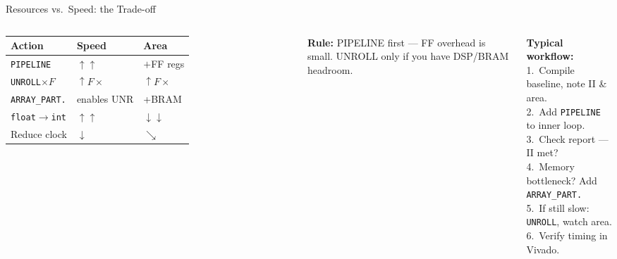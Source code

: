 \documentclass[aspectratio=169,12pt]{beamer}
\begin{document}
\begin{frame}{Resources vs.\ Speed: the Trade-off}
\vspace{0.1cm}
\begin{columns}[T,totalwidth=\textwidth]


  \begin{tabular}{p{2.6cm}p{1.2cm}p{1.6cm}}
    \hline
    \rowcolor{Navy!10}\textbf{Action} & \textbf{Speed} & \textbf{Area}\\
    \hline
    \texttt{PIPELINE}      & $\uparrow\uparrow$ & $+$FF regs\\
    \rowcolor{Navy!5}\texttt{UNROLL}$\times F$ & $\uparrow F\times$ & $\uparrow F\times$\\
    \texttt{ARRAY\_PART.}  & enables UNR & +BRAM\\
    \rowcolor{Navy!5}\texttt{float}$\to$\texttt{int} & $\uparrow\uparrow$ & $\downarrow\downarrow$\\
    Reduce clock           & $\downarrow$ & $\searrow$\\
    \hline
  \end{tabular}

  \vspace{10pt}
  {\color{Orange}\bfseries\small Rule:} {\small PIPELINE first — FF overhead is small.
  UNROLL only if you have DSP/BRAM headroom.}


  \vspace{0.1cm}

  \colorbox{Teal!10}{\parbox{\dimexpr\linewidth-2\fboxsep\relax}{\vspace{4pt}
    {\color{Teal}\bfseries Typical workflow:}\\[3pt]
    {\small
    1.\ Compile baseline, note II \& area.\\[2pt]
    2.\ Add \texttt{PIPELINE} to inner loop.\\[2pt]
    3.\ Check report — II met?\\[2pt]
    4.\ Memory bottleneck? Add \texttt{ARRAY\_PART.}\\[2pt]
    5.\ If still slow: \texttt{UNROLL}, watch area.\\[2pt]
    6.\ Verify timing in Vivado.}
  \vspace{4pt}}}

\end{columns}
\end{frame}
\end{document}
